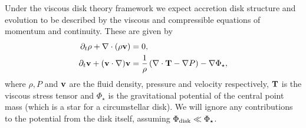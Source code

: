 Under the viscous disk theory framework we expect accretion disk structure and evolution to be described by the viscous and compressible equations of momentum and continuity.
These are given by \citep[e.g.][]{landau1959}
\begin{align}
    \partial_t \rho + \nabla \cdot (\rho \mathbf{v}) &= 0, \label{eq:fluid_cont} \\
    \partial_t \mathbf{v} + (\mathbf{v} \cdot \nabla) \mathbf{v} &= \frac{1}{\rho} \left( \nabla \cdot \mathbf{T} - \nabla P  \right) - \nabla \Phi_\star, \label{eq:fluid_mom}
\end{align}
where $\rho, P$ and $\mathbf{v}$ are the fluid density, pressure and velocity respectively, $\mathbf{T}$ is the viscous stress tensor and $\Phi_\star$ is the gravitational potential of the central point mass (which is a star for a circumstellar disk).
We will ignore any contributions to the potential from the disk itself, assuming $\Phi_{\rm disk} \ll \Phi_\star$.

